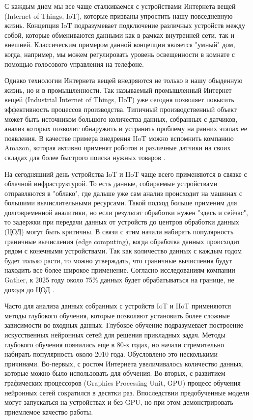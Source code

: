 
С каждым днем мы все чаще сталкиваемся с устройствами Интернета вещей (Internet of Things, IoT), которые призваны упростить 
нашу повседневную жизнь. Концепция IoT подразумевает подключение различных устройств между собой, которые обмениваются 
данными как в рамках внутренней сети, так и внешней. Классическим примером данной концепции является "умный" дом, когда, 
например, мы можем регулировать уровень освещенности в комнате с помощью голосового управления на телефоне. 

Однако технологии Интернета вещей внедряются не только в нашу обыденную жизнь, но и в промышленности. Так называемый 
промышленный Интернет вещей (Industrial Internet of Things, IIoT) уже сегодня позволяет повысить эффективность процессов 
производства. Типичный производственный объект может быть источником большого количества данных, собранных с датчиков, 
анализ которых позволит обнаружить и устранить проблему на ранних этапах ее появления. В качестве примера внедрения IIoT 
можно вспомнить компанию Amazon, которая активно применят роботов и различные датчики на своих складах для более быстрого 
поиска нужных товаров \cite{AMAZON_WH}.

На сегодняшний день устройства IoT и IIoT чаще всего применяются в связке с облачной инфраструктурой. То есть данные, 
собираемые устройствами отправляются в "облако", где дальше уже сам анализ происходит на машинах с большими вычислительными
ресурсами. Такой подход больше применим для долговременной аналитики, но если результат обработки нужен "здесь и сейчас", 
то задержки при передачи данных от устройств до центров обработки данных (ЦОД) могут быть критичны. В связи с этим начали 
набирать популярность граничные вычисления (edge computing), когда обработка данных происходит рядом с конечными устройствами. 
Так как количество данных с каждым годом будет только расти, то можно утверждать, что граничные вычисления будут находить 
все более широкое применение. Согласно исследованиям компании Gather, к 2025 году около 75\% данных будет обрабатываться 
на границе, не доходя до ЦОД \cite{GATHER_RCH}.

Часто для анализа данных собранных с устройств IoT и IIoT применяются методы глубокого обучения, которые позволяют 
установить более сложные зависимости во входных данных. Глубокое обучение подразумевает построение искусственных нейронных 
сетей для решения прикладных задач. Методы глубокого обучения появились еще в 80-х годах, но начали стремительно набирать
популярность около 2010 года. Обусловлено это несколькими причинами. Во-первых, с ростом Интернета увеличивалось количество
данных, которые можно было использовать для обучения. Во-вторых, с развитием графических процессоров (Graphics Processing Unit, GPU)
процесс обучения нейронных сетей сократился в десятки раз. Впоследствии предобученные модели могут запускаться на устройствах
и без GPU, но при этом демонстрировать приемлемое качество работы.

